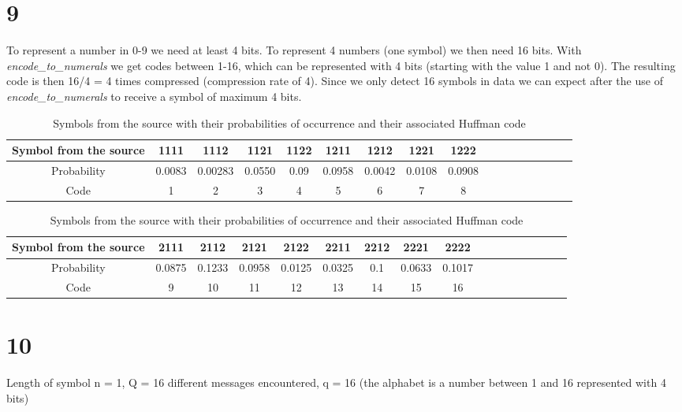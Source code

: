 \documentclass[a4paper,12pt]{article}
\begin{document}
\section*{9}
To represent a number in 0-9 we need at least 4 bits. To represent 4 numbers (one symbol) we then need 16 bits. With \textit{encode\_to\_numerals} we get codes between 1-16, which can be represented with 4 bits (starting with the value 1 and not 0). The resulting code is then 16/4 = 4 times compressed (compression rate of 4). Since we only detect 16 symbols in data we can expect after the use of \textit{encode\_to\_numerals} to receive a symbol of maximum 4 bits.
\begin{table}[h!]

\begin{center}

\begin{adjustbox}{max width=\linewidth}
\begin{tabular}{|c|c|c|c|c|c|c|c|c|c|c|c|c|c|c|c|c|}
 \hline 
 Symbol from the source & 1111 & 1112 & 1121 & 1122 & 1211 & 1212 & 1221 & 1222 \\ 
 \hline 
 Probability & 0.0083 & 0.00283 & 0.0550 & 0.09 & 0.0958 & 0.0042 & 0.0108 & 0.0908  \\ 
 \hline 
 Code  & 1 & 2 & 3 & 4 & 5 & 6 & 7 & 8 \\ 
 \hline 
\end{tabular}
\end{adjustbox}

\begin{adjustbox}{max width=\linewidth}
\begin{tabular}{|c|c|c|c|c|c|c|c|c|c|c|c|c|c|c|c|c|}
 \hline 
 Symbol from the source & 2111 & 2112 & 2121 & 2122 & 2211 & 2212 & 2221 & 2222 \\ 
 \hline 
 Probability  & 0.0875 & 0.1233 & 0.0958 & 0.0125 & 0.0325 & 0.1 & 0.0633 & 0.1017 \\ 
 \hline 
 Code & 9 & 10 & 11 & 12 & 13 & 14 & 15 & 16 \\ 
 \hline 
\end{tabular}
\end{adjustbox}
\end{center}
\caption{Symbols from the source with their probabilities of occurrence and their associated Huffman code}  
\end{table} 


\section*{10} 
Length of symbol n = 1, Q = 16 different messages encountered, q = 16 (the alphabet is a number between 1 and 16 represented with 4 bits)
\end{document}
